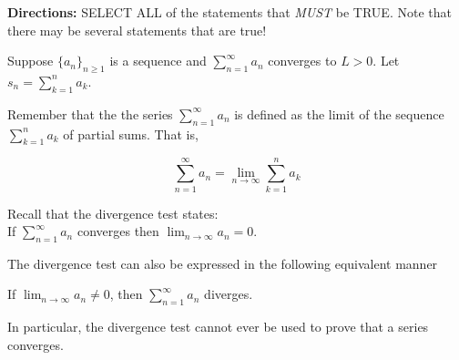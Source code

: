 \documentclass{ximera}
\author{Jim Talamo,Jason Miller}
\begin{document}
\begin{exercise}


\textbf{Directions:} SELECT ALL of the statements that \emph{MUST} be TRUE.  Note that there may be several statements that are true! 

 Suppose $\displaystyle\{a_n\}_{n \geq 1}$ is a sequence and $\displaystyle \sum^{\infty}_{n= 1} a_n$ converges to $L>0$.  Let $s_n =\displaystyle  \sum^n_{k=1} a_k$.

\begin{selectAll}
\end{selectAll}

\begin{hint}
Remember that the the series $\sum^{\infty}_{n=1} a_n$ is defined as the limit of the sequence $\sum^{n}_{k=1} a_k$ of partial sums. That is, 

\[
\sum^{\infty}_{n=1} a_n = \lim_{n \to \infty} \sum^n_{k=1} a_k
\]
\end{hint}


\begin{hint}
Recall that the divergence test states: \\
If $\sum^{\infty}_{n=1} a_n $ converges then $\lim_{n \to \infty} a_n=0$. 

The divergence test can also be expressed in the following equivalent manner

If $\lim_{n \to \infty} a_n \neq 0$, then $\sum^{\infty}_{n=1} a_n$ diverges. 

In particular, the divergence test cannot ever be used to prove that a series converges.
\end{hint}

\end{exercise}
\end{document}
